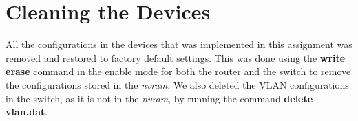 \documentclass{article}
\begin{document}
\section{Cleaning the Devices}

All the configurations in the devices that was implemented in this assignment was removed and restored to factory default settings. This was done using the \textbf{write erase} command in the enable mode for both the router and the switch to remove the configurations stored in the \textit{nvram}. We also deleted the VLAN configurations in the switch, as it is not in the \textit{nvram}, by running the command \textbf{delete vlan.dat}. 
\end{document}
